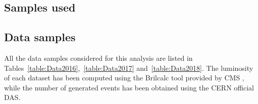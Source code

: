 \documentclass[a4paper, 10pt, openright]{report}
\begin{document}
\begin{appendices}

\chapter{Samples used} \label{appendix:Samples}
\section{Data samples} \label{appendix:DataSamples}

All the data samples considered for this analysis are listed in Tables~\ref{table:Data2016},~\ref{table:Data2017} and~\ref{table:Data2018}. The luminosity of each dataset has been computed using the Brilcalc tool provided by \ac{CMS} \cite{Brilcalc}, while the number of generated events has been obtained using the CERN official \acf{DAS}.


\end{appendices}
\end{document}
